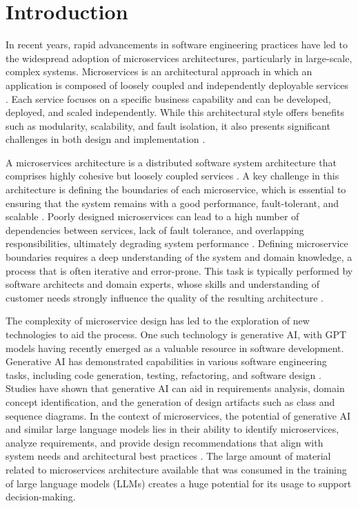 \documentclass[runningheads]{llncs}
\begin{document}
\section{Introduction}

In recent years, rapid advancements in software engineering practices have led to the widespread adoption of microservices architectures, particularly in large-scale, complex systems. Microservices is an architectural approach in which an application is composed of loosely coupled and independently deployable services \cite{newman2015building,microservices2023}. Each service focuses on a specific business capability and can be developed, deployed, and scaled independently\cite{microservices2022}. While this architectural style offers benefits such as modularity, scalability, and fault isolation, it also presents significant challenges in both design and implementation \cite{fowler2014}.

A microservices architecture is a distributed software system architecture that comprises highly cohesive but loosely coupled services \cite{dragoni2017microservices}. A key challenge in this architecture is defining the boundaries of each microservice, which is essential to ensuring that the system remains with a good performance, fault-tolerant, and scalable \cite{balalaie2016microservices}. Poorly designed microservices can lead to a high number of dependencies between services, lack of fault tolerance, and overlapping responsibilities, ultimately degrading system performance \cite{richardson2018pattern}. Defining microservice boundaries requires a deep understanding of the system and domain knowledge, a process that is often iterative and error-prone. This task is typically performed by software architects and domain experts, whose skills and understanding of customer needs strongly influence the quality of the resulting architecture \cite{evans2003domain}.

The complexity of microservice design has led to the exploration of new technologies to aid the process. One such technology is generative AI, with GPT models having recently emerged as a valuable resource in software development. Generative AI has demonstrated capabilities in various software engineering tasks, including code generation\cite{liu2023improving}, testing, refactoring, and software design \cite{jiang2021survey}. Studies have shown that generative AI can aid in requirements analysis\cite{white2024chatgpt}, domain concept identification, and the generation of design artifacts such as class and sequence diagrams. In the context of microservices, the potential of generative AI and similar large language models lies in their ability to identify microservices\cite{stojanovic2023application}, analyze requirements, and provide design recommendations that align with system needs and architectural best practices \cite{meyer2023}. The large amount of material related to microservices architecture available that was consumed in the training of large language models (LLMs) creates a huge potential for its usage to support decision-making.
\end{document}
